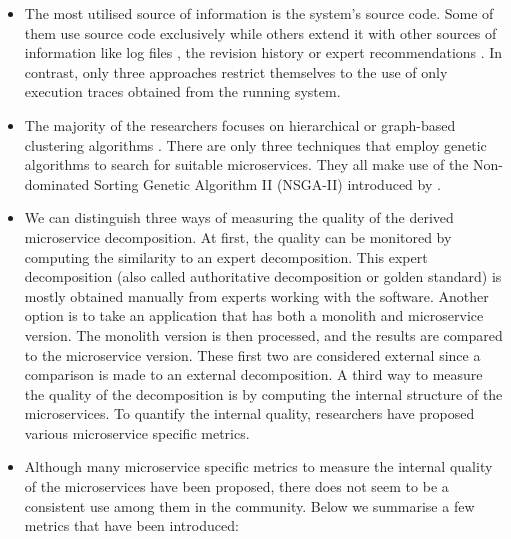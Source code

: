\begin{itemize}
    \item The most utilised source of information is the system's source code. Some of them use source code exclusively \cite{al2021microservice, brito2021identification, kamimura2018extracting, nunes2019monolith, saidani2019towards, selmadji2018re} while others extend it with other sources of information like log files \cite{de2018function, matias2020determining}, the revision history \cite{eski2018automatic, lohnertz2020steinmetz, mazlami2017extraction} or expert recommendations \cite{selmadji2020monolithic}. In contrast, only three approaches \cite{jin2018functionality, jin2019service, zhang2020automated} restrict themselves to the use of only execution traces obtained from the running system.
    \item The majority of the researchers focuses on hierarchical \cite{jin2018functionality, kamimura2018extracting, nunes2019monolith, selmadji2018re, selmadji2020monolithic} or graph-based clustering algorithms \cite{al2021microservice, brito2021identification, de2018function, eski2018automatic, lohnertz2020steinmetz, matias2020determining, mazlami2017extraction}. There are only three techniques that employ genetic algorithms \cite{jin2019service, saidani2019towards, zhang2020automated} to search for suitable microservices. They all make use of the Non-dominated Sorting Genetic Algorithm II (NSGA-II) introduced by \citeauthor{deb2002fast} \cite{deb2002fast}.
    \item We can distinguish three ways of measuring the quality of the derived microservice decomposition. At first, the quality can be monitored by computing the similarity to an expert decomposition. This expert decomposition (also called authoritative decomposition or golden standard) is mostly obtained manually from experts working with the software. Another option is to take an application that has both a monolith and microservice version. The monolith version is then processed, and the results are compared to the microservice version. These first two are considered external since a comparison is made to an external decomposition. A third way to measure the quality of the decomposition is by computing the internal structure of the microservices. To quantify the internal quality, researchers have proposed various microservice specific metrics. 
    \item Although many microservice specific metrics to measure the internal quality of the microservices have been proposed, there does not seem to be a consistent use among them in the community. Below we summarise a few metrics that have been introduced:

\end{itemize}
